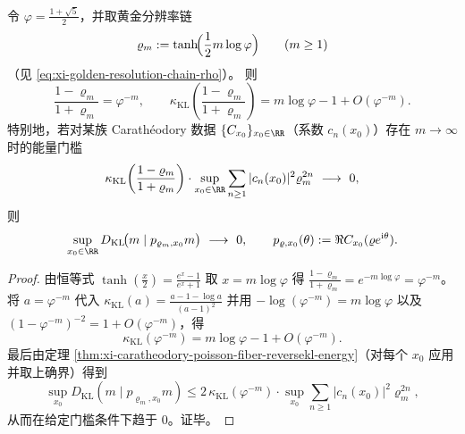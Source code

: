 \begin{corollary}[黄金分辨率链上的线性对数门槛]\label{cor:xi-golden-chain-reversekl-log-barrier}
令 \(\varphi=\frac{1+\sqrt5}{2}\)，并取黄金分辨率链
\[
\varrho_m:=\tanh\!\Bigl(\frac12 m\log\varphi\Bigr)\qquad(m\ge 1)
\]
（见 \eqref{eq:xi-golden-resolution-chain-rho}）。
则
\[
\frac{1-\varrho_m}{1+\varrho_m}=\varphi^{-m},
\qquad
\kappa_{\mathrm{KL}}\!\left(\frac{1-\varrho_m}{1+\varrho_m}\right)
=m\log\varphi-1+O(\varphi^{-m}).
\]
特别地，若对某族 Carath\'eodory 数据 \(\{C_{x_0}\}_{x_0\in\RR}\)（系数 \(c_n(x_0)\)）存在 \(m\to\infty\) 时的能量门槛
\[
\kappa_{\mathrm{KL}}\!\left(\frac{1-\varrho_m}{1+\varrho_m}\right)\cdot
\sup_{x_0\in\RR}\sum_{n\ge 1}|c_n(x_0)|^2\varrho_m^{2n}\ \longrightarrow\ 0,
\]
则
\[
\sup_{x_0\in\RR}D_{\mathrm{KL}}\!\bigl(m\mid p_{\varrho_m,x_0}m\bigr)\ \longrightarrow\ 0,
\qquad
p_{\varrho,x_0}(\theta):=\Re C_{x_0}(\varrho e^{\mathrm i\theta}).
\]
\end{corollary}
\begin{proof}
由恒等式 \(\tanh(\tfrac{x}{2})=\frac{e^x-1}{e^x+1}\) 取 \(x=m\log\varphi\) 得
\(
\frac{1-\varrho_m}{1+\varrho_m}=e^{-m\log\varphi}=\varphi^{-m}
\)。
将 \(a=\varphi^{-m}\) 代入
\(
\kappa_{\mathrm{KL}}(a)=\frac{a-1-\log a}{(a-1)^2}
\)
并用 \(-\log(\varphi^{-m})=m\log\varphi\) 以及 \((1-\varphi^{-m})^{-2}=1+O(\varphi^{-m})\)，得
\[
\kappa_{\mathrm{KL}}(\varphi^{-m})=m\log\varphi-1+O(\varphi^{-m}).
\]
最后由定理 \ref{thm:xi-caratheodory-poisson-fiber-reversekl-energy}（对每个 \(x_0\) 应用并取上确界）得到
\[
\sup_{x_0}D_{\mathrm{KL}}(m\mid p_{\varrho_m,x_0}m)
\le
2\,\kappa_{\mathrm{KL}}(\varphi^{-m})\cdot
\sup_{x_0}\sum_{n\ge 1}|c_n(x_0)|^2\varrho_m^{2n},
\]
从而在给定门槛条件下趋于 \(0\)。证毕。
\end{proof}

\endinput

